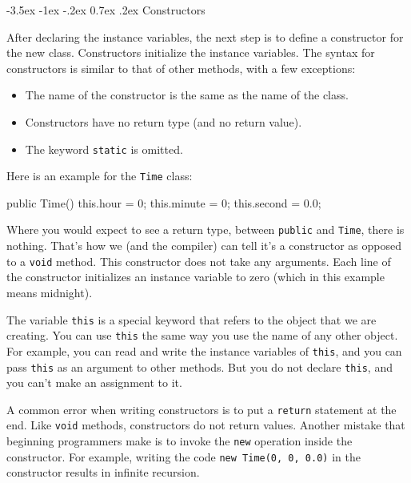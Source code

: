 \documentclass[12pt]{book}
\makeatletter
\theoremstyle{exercise}
\newcommand{\java}[1]{\verb"#1"}
\renewcommand{\section}{\@startsection {section}{1}{\z@}%
    {-3.5ex \@plus -1ex \@minus -.2ex}%
    {0.7ex \@plus.2ex}%
    {\normalfont\Large\bfseries}}
\newcommand{\java}[1]{\lstinline{#1}} %
\makeatother
\begin{document}


\section{Constructors}


After declaring the instance variables, the next step is to define a constructor for the new class.
Constructors initialize the instance variables.
The syntax for constructors is similar to that of other methods, with a few exceptions:

\begin{itemize}
\item The name of the constructor is the same as the name of the class.
\item Constructors have no return type (and no return value).
\item The keyword \java{static} is omitted.
\end{itemize}

Here is an example for the \java{Time} class:

\begin{code}
    public Time() {
        this.hour = 0;
        this.minute = 0;
        this.second = 0.0;
    }
\end{code}

Where you would expect to see a return type, between \java{public} and \java{Time}, there is nothing.
That's how we (and the compiler) can tell it's a constructor as opposed to a \java{void} method.
This constructor does not take any arguments.
Each line of the constructor initializes an instance variable to zero (which in this example means midnight).


The variable \java{this} is a special keyword that refers to the object that we are creating.
You can use \java{this} the same way you use the name of any other object.
For example, you can read and write the instance variables of \java{this}, and you can pass \java{this} as an argument to other methods.
But you do not declare \java{this}, and you can't make an assignment to it.

A common error when writing constructors is to put a \java{return} statement at the end.
Like \java{void} methods, constructors do not return values.
Another mistake that beginning programmers make is to invoke the \java{new} operation inside the constructor.
For example, writing the code \java{new Time(0, 0, 0.0)} in the constructor results in infinite recursion.
\end{document}
